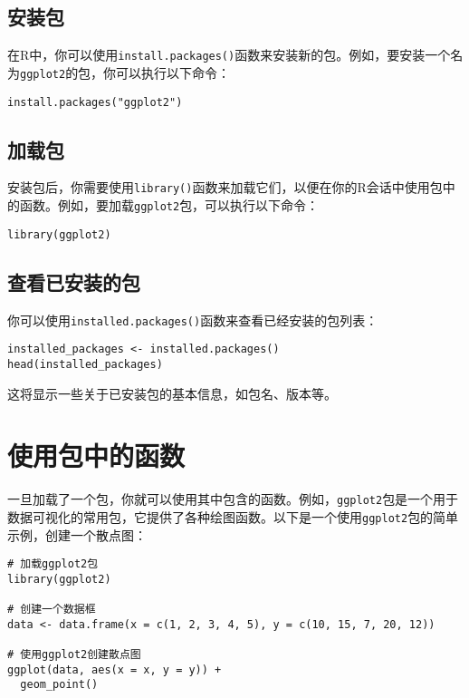 \documentclass[
  letterpaper,
  DIV=11,
  numbers=noendperiod]{scrreprt}
\begin{document}
\hypertarget{ux5b89ux88c5ux5305}{%
\subsection{安装包}\label{ux5b89ux88c5ux5305}}

在R中，你可以使用\texttt{install.packages()}函数来安装新的包。例如，要安装一个名为\texttt{ggplot2}的包，你可以执行以下命令：

\begin{verbatim}
install.packages("ggplot2")
\end{verbatim}

\hypertarget{ux52a0ux8f7dux5305}{%
\subsection{加载包}\label{ux52a0ux8f7dux5305}}

安装包后，你需要使用\texttt{library()}函数来加载它们，以便在你的R会话中使用包中的函数。例如，要加载\texttt{ggplot2}包，可以执行以下命令：

\begin{verbatim}
library(ggplot2)
\end{verbatim}

\hypertarget{ux67e5ux770bux5df2ux5b89ux88c5ux7684ux5305}{%
\subsection{查看已安装的包}\label{ux67e5ux770bux5df2ux5b89ux88c5ux7684ux5305}}

你可以使用\texttt{installed.packages()}函数来查看已经安装的包列表：

\begin{verbatim}
installed_packages <- installed.packages()
head(installed_packages)
\end{verbatim}

这将显示一些关于已安装包的基本信息，如包名、版本等。

\hypertarget{ux4f7fux7528ux5305ux4e2dux7684ux51fdux6570}{%
\section{使用包中的函数}\label{ux4f7fux7528ux5305ux4e2dux7684ux51fdux6570}}

一旦加载了一个包，你就可以使用其中包含的函数。例如，\texttt{ggplot2}包是一个用于数据可视化的常用包，它提供了各种绘图函数。以下是一个使用\texttt{ggplot2}包的简单示例，创建一个散点图：

\begin{verbatim}
# 加载ggplot2包
library(ggplot2)

# 创建一个数据框
data <- data.frame(x = c(1, 2, 3, 4, 5), y = c(10, 15, 7, 20, 12))

# 使用ggplot2创建散点图
ggplot(data, aes(x = x, y = y)) +
  geom_point()
\end{verbatim}
\end{document}
